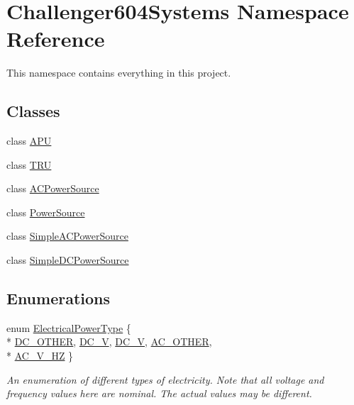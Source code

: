 \hypertarget{namespace_challenger604_systems}{\section{Challenger604\-Systems Namespace Reference}
\label{namespace_challenger604_systems}
}


This namespace contains everything in this project.  


\subsection*{Classes}
\begin{DoxyCompactItemize}
\item 
class \hyperlink{class_challenger604_systems_1_1_a_p_u}{A\-P\-U}
\item 
class \hyperlink{class_challenger604_systems_1_1_t_r_u}{T\-R\-U}
\item 
class \hyperlink{class_challenger604_systems_1_1_a_c_power_source}{A\-C\-Power\-Source}
\item 
class \hyperlink{class_challenger604_systems_1_1_power_source}{Power\-Source}
\item 
class \hyperlink{class_challenger604_systems_1_1_simple_a_c_power_source}{Simple\-A\-C\-Power\-Source}
\item 
class \hyperlink{class_challenger604_systems_1_1_simple_d_c_power_source}{Simple\-D\-C\-Power\-Source}
\end{DoxyCompactItemize}
\subsection*{Enumerations}
\begin{DoxyCompactItemize}
\item 
enum \hyperlink{namespace_challenger604_systems_a9ad1a793d94b97514092692cb7315afd}{Electrical\-Power\-Type} \{ \\*
\hyperlink{namespace_challenger604_systems_a9ad1a793d94b97514092692cb7315afdac443cb4f2e9c8fb362d1b23d390680c1}{D\-C\-\_\-\-O\-T\-H\-E\-R}, 
\hyperlink{namespace_challenger604_systems_a9ad1a793d94b97514092692cb7315afdaeb46efa4ea7afd565b7f41c0881a206d}{D\-C\-\_\-V}, 
\hyperlink{namespace_challenger604_systems_a9ad1a793d94b97514092692cb7315afdaa549263d4db7adacf1008dac6a68b21d}{D\-C\-\_\-V}, 
\hyperlink{namespace_challenger604_systems_a9ad1a793d94b97514092692cb7315afda2fcb938b597382142bdc684898fe8596}{A\-C\-\_\-\-O\-T\-H\-E\-R}, 
\\*
\hyperlink{namespace_challenger604_systems_a9ad1a793d94b97514092692cb7315afdade695fe37c4e590d464845feb03fcfde}{A\-C\-\_\-V\-\_\-H\-Z}
 \}
\begin{DoxyCompactList}\small\item\em An enumeration of different types of electricity. Note that all voltage and frequency values here are nominal. The actual values may be different. \end{DoxyCompactList}\end{DoxyCompactItemize}


